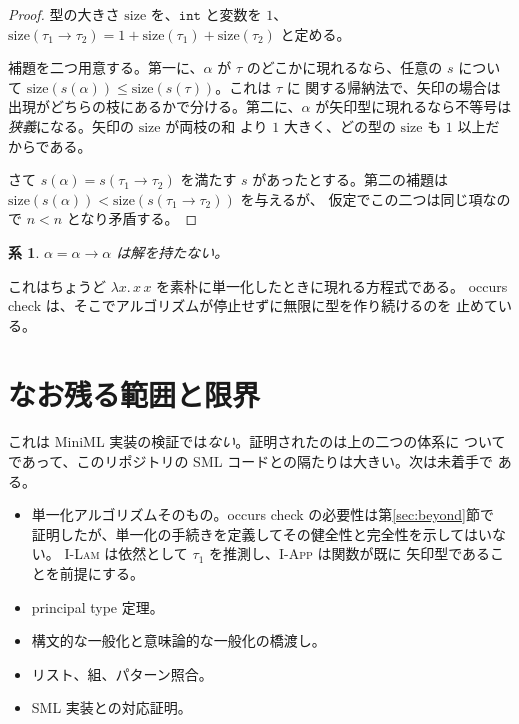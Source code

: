 \documentclass[11pt,a4paper]{ltjsarticle}
\newtheorem{corollary}[theorem]{系}
\newcommand{\tint}{\mathtt{int}}
\begin{document}
\begin{proof}
型の大きさ $\mathrm{size}$ を、$\tint$ と変数を $1$、
$\mathrm{size}(\tau_1 \to \tau_2) = 1 + \mathrm{size}(\tau_1) +
\mathrm{size}(\tau_2)$ と定める。

補題を二つ用意する。第一に、$\alpha$ が $\tau$ のどこかに現れるなら、任意の $s$
について $\mathrm{size}(s(\alpha)) \leq \mathrm{size}(s(\tau))$。これは $\tau$ に
関する帰納法で、矢印の場合は出現がどちらの枝にあるかで分ける。第二に、$\alpha$
が矢印型に現れるなら不等号は\emph{狭義}になる。矢印の $\mathrm{size}$ が両枝の和
より $1$ 大きく、どの型の $\mathrm{size}$ も $1$ 以上だからである。

さて $s(\alpha) = s(\tau_1 \to \tau_2)$ を満たす $s$ があったとする。第二の補題は
$\mathrm{size}(s(\alpha)) < \mathrm{size}(s(\tau_1 \to \tau_2))$ を与えるが、
仮定でこの二つは同じ項なので $n < n$ となり矛盾する。
\end{proof}

\begin{corollary}
  $\alpha = \alpha \to \alpha$ は解を持たない。
\end{corollary}

これはちょうど $\lambda x.\,x\,x$ を素朴に単一化したときに現れる方程式である。
occurs check は、そこでアルゴリズムが停止せずに無限に型を作り続けるのを
止めている。

\section{なお残る範囲と限界}
\label{sec:limits}

これは MiniML 実装の検証では\emph{ない}。証明されたのは上の二つの体系に
ついてであって、このリポジトリの SML コードとの隔たりは大きい。次は未着手で
ある。

\begin{itemize}
  \item 単一化アルゴリズムそのもの。occurs check の必要性は第\ref{sec:beyond}節で
  証明したが、単一化の手続きを定義してその健全性と完全性を示してはいない。
  \textsc{I-Lam} は依然として $\tau_1$ を推測し、\textsc{I-App} は関数が既に
  矢印型であることを前提にする。
  \item principal type 定理。
  \item 構文的な一般化と意味論的な一般化の橋渡し。
  \item リスト、組、パターン照合。
  \item SML 実装との対応証明。
\end{itemize}
\end{document}

